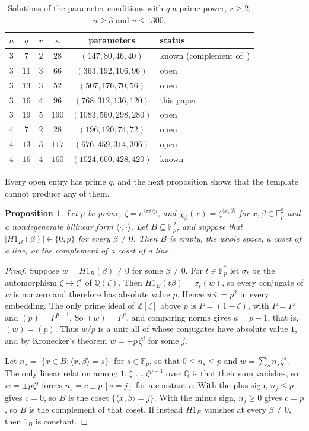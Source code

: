 \documentclass[11pt]{amsart}
\newtheorem{proposition}[theorem]{Proposition}
\theoremstyle{definition}
\newcommand{\F}{\mathbb{F}}
\begin{document}
\begin{table}[ht]
\centering
\caption{Solutions of the parameter conditions with $q$ a prime power, $r\ge2$, $n\ge3$ and $v\le1300$.}\label{tab:template}
\begin{tabular}{cccccl}
\toprule
$n$ & $q$ & $r$ & $\kappa$ & parameters & status\\
\midrule
$3$ & $7$ & $2$ & $28$ & $(147,80,46,40)$ & known (complement of~\cite{Brady2025})\\
$3$ & $11$ & $3$ & $66$ & $(363,192,106,96)$ & open\\
$3$ & $13$ & $3$ & $52$ & $(507,176,70,56)$ & open\\
$3$ & $16$ & $4$ & $96$ & $(768,312,136,120)$ & this paper\\
$3$ & $19$ & $5$ & $190$ & $(1083,560,298,280)$ & open\\
$4$ & $7$ & $2$ & $28$ & $(196,120,74,72)$ & open\\
$4$ & $13$ & $3$ & $117$ & $(676,459,314,306)$ & open\\
$4$ & $16$ & $4$ & $160$ & $(1024,660,428,420)$ & known\\
\bottomrule
\end{tabular}
\end{table}

Every open entry has prime $q$, and the next proposition shows that the template cannot produce any of them.

\begin{proposition}\label{prop:prime}
Let $p$ be prime, $\zeta=e^{2\pi i/p}$, and $\chi_\beta(x)=\zeta^{\langle x,\beta\rangle}$ for $x,\beta\in\F_p^2$ and a nondegenerate bilinear form $\langle\cdot,\cdot\rangle$. Let $B\subseteq\F_p^2$, and suppose that $|H1_B(\beta)|\in\{0,p\}$ for every $\beta\ne0$. Then $B$ is empty, the whole space, a coset of a line, or the complement of a coset of a line.
\end{proposition}

\begin{proof}
Suppose $w=H1_B(\beta)\ne0$ for some $\beta\ne0$. For $t\in\F_p^*$ let $\sigma_t$ be the automorphism $\zeta\mapsto\zeta^t$ of $\mathbb{Q}(\zeta)$. Then $H1_B(t\beta)=\sigma_t(w)$, so every conjugate of $w$ is nonzero and therefore has absolute value $p$. Hence $w\bar w=p^2$ in every embedding. The only prime ideal of $\mathbb{Z}[\zeta]$ above $p$ is $P=(1-\zeta)$, with $P=\bar P$ and $(p)=P^{p-1}$. So $(w)=P^a$, and comparing norms gives $a=p-1$, that is, $(w)=(p)$. Thus $w/p$ is a unit all of whose conjugates have absolute value $1$, and by Kronecker's theorem $w=\pm p\,\zeta^j$ for some $j$.

Let $n_s=|\{x\in B:\langle x,\beta\rangle=s\}|$ for $s\in\F_p$, so that $0\le n_s\le p$ and $w=\sum_s n_s\zeta^s$. The only linear relation among $1,\zeta,\dots,\zeta^{p-1}$ over $\mathbb{Q}$ is that their sum vanishes, so $w=\pm p\zeta^j$ forces $n_s=c\pm p\,[s=j]$ for a constant $c$. With the plus sign, $n_j\le p$ gives $c=0$, so $B$ is the coset $\{\langle x,\beta\rangle=j\}$. With the minus sign, $n_j\ge0$ gives $c=p$, so $B$ is the complement of that coset. If instead $H1_B$ vanishes at every $\beta\ne0$, then $1_B$ is constant.
\end{proof}
\end{document}
